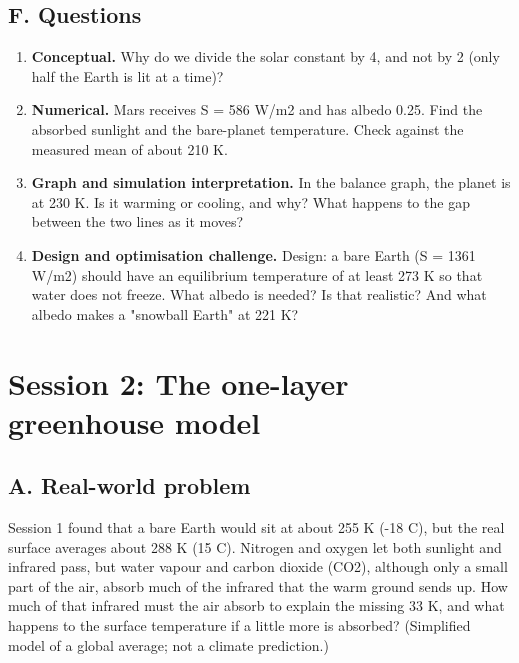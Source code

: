\documentclass[11pt,a4paper]{article}
\begin{document}
\subsection*{F. Questions}
\begin{enumerate}[nosep]
\item \textbf{Conceptual.} Why do we divide the solar constant by 4, and not by 2 (only half the Earth is lit at a time)?
\item \textbf{Numerical.} Mars receives S = 586 W/m2 and has albedo 0.25. Find the absorbed sunlight and the bare-planet temperature. Check against the measured mean of about 210 K.
\item \textbf{Graph and simulation interpretation.} In the balance graph, the planet is at 230 K. Is it warming or cooling, and why? What happens to the gap between the two lines as it moves?
\item \textbf{Design and optimisation challenge.} Design: a bare Earth (S = 1361 W/m2) should have an equilibrium temperature of at least 273 K so that water does not freeze. What albedo is needed? Is that realistic? And what albedo makes a "snowball Earth" at 221 K?
\end{enumerate}

\section{Session 2: The one-layer greenhouse model}

\subsection*{A. Real-world problem}
Session 1 found that a bare Earth would sit at about 255 K (-18 C), but the real surface averages about 288 K (15 C). Nitrogen and oxygen let both sunlight and infrared pass, but water vapour and carbon dioxide (CO2), although only a small part of the air, absorb much of the infrared that the warm ground sends up. How much of that infrared must the air absorb to explain the missing 33 K, and what happens to the surface temperature if a little more is absorbed? (Simplified model of a global average; not a climate prediction.)
\end{document}
